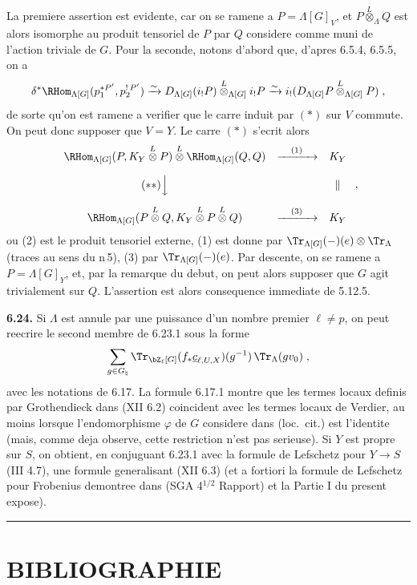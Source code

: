 La premiere assertion est evidente, car on se ramene a $P = \Lambda[G]_V$, et $P \overset{L}{\otimes}_\Lambda Q$ est alors isomorphe au produit tensoriel de $P$ par $Q$ considere comme muni de l'action triviale de $G$. Pour la seconde, notons d'abord que, d'apres 6.5.4, 6.5.5, on a
\[
\delta^*\RHom_{\Lambda[G]}(p_1^{*P'}, p_2^{!\,P'}) \xrightarrow{\sim} D_{\Lambda[G]}(i_!P) \overset{L}{\otimes}_{\Lambda[G]} i_!P \xrightarrow{\sim} i_!(D_{\Lambda[G]}P \overset{L}{\otimes}_{\Lambda[G]} P)\;,
\]
de sorte qu'on est ramene a verifier que le carre induit par $(*)$ sur $V$ commute. On peut donc supposer que $V=Y$. Le carre $(*)$ s'ecrit alors
\[
\begin{array}{ccc}
\RHom_{\Lambda[G]}(P, K_Y \overset{L}{\otimes} P) \overset{L}{\otimes} \RHom_{\Lambda[G]}(Q,Q) & \xrightarrow{\quad(1)\quad} & K_Y \\[10pt]
\llap{$(**)$}\Big\downarrow & & \parallel \\[12pt]
\RHom_{\Lambda[G]}(P \overset{L}{\otimes} Q, K_Y \overset{L}{\otimes} P \overset{L}{\otimes} Q) & \xrightarrow{\quad(3)\quad} & K_Y
\end{array}\;,
\]
ou (2) est le produit tensoriel externe, (1) est donne par $\Tr_{\Lambda[G]}(-)(e) \otimes \Tr_\Lambda$ (traces au sens du n\textdegree\,5), (3) par $\Tr_{\Lambda[G]}(-)(e)$. Par descente, on se ramene a $P = \Lambda[G]_Y$, et, par la remarque du debut, on peut alors supposer que $G$ agit trivialement sur $Q$. L'assertion est alors consequence immediate de 5.12.5.

\medskip
\noindent\textbf{6.24.} Si $\Lambda$ est annule par une puissance d'un nombre premier $\ell \not= p$, on peut reecrire le second membre de 6.23.1 sous la forme
\[
\sum_{g \in G_\natural} \Tr_{\bZ_\ell[G]}(f_*\underline{c}_{\ell,U,X})(g^{-1})\,\Tr_\Lambda(gv_0)\;,
\]
avec les notations de 6.17. La formule 6.17.1 montre que les termes locaux definis par Grothendieck dans (XII 6.2) coincident avec les termes locaux de Verdier, au moins lorsque l'endomorphisme $\varphi$ de $G$ considere dans (loc.\ cit.) est l'identite (mais, comme deja observe, cette restriction n'est pas serieuse). Si $Y$ est propre sur $S$, on obtient, en conjuguant 6.23.1 avec la formule de Lefschetz pour $Y \longrightarrow S$ (III 4.7), une formule generalisant (XII 6.3) (et a fortiori la formule de Lefschetz pour Frobenius demontree dans (SGA 4$^{1/2}$ Rapport) et la Partie I du present expose).

\bigskip
\hrule
\bigskip

\section*{BIBLIOGRAPHIE}

